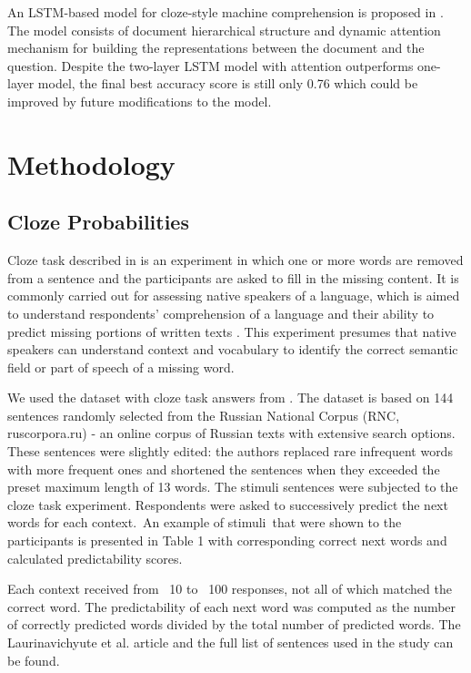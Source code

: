 \documentclass[a4paper]{article}
\begin{document}
An LSTM-based model for cloze-style machine comprehension is proposed in \cite{wang-cloze}. The model consists of document hierarchical structure and dynamic attention mechanism for building the representations between the document and the question. Despite the two-layer LSTM model with attention outperforms one-layer model, the final best accuracy score is still only 0.76 which could be improved by future modifications to the model.


\section{Methodology}

\subsection{Cloze Probabilities}

Cloze task described in \cite{taylor:1953} is an experiment in which one or more words are removed from a sentence and the participants are asked to fill in the missing content. It is commonly carried out for assessing native speakers of a language, which is aimed to understand respondents’ comprehension of a language and their ability to predict missing portions of written texts \cite{laurinavichyute}. This experiment presumes that native speakers can understand context and vocabulary to identify the correct semantic field or part of speech of a missing word.

We used the dataset with cloze task answers from \cite{laurinavichyute}. The dataset is based on 144 sentences randomly selected from the Russian National Corpus (RNC, ruscorpora.ru) - an online corpus of Russian texts with extensive search options. These sentences were slightly edited: the authors replaced rare infrequent words with more frequent ones and shortened the sentences when they exceeded the preset maximum length of 13 words. The stimuli sentences were subjected to the cloze task experiment. Respondents were asked to successively predict the next words for each context. An example of stimuli that were shown to the participants is presented in Table 1 with corresponding correct next words and calculated predictability scores.

Each context received from ~10 to ~100 responses, not all of which matched the correct word. The predictability of each next word was computed as the number of correctly predicted words divided by the total number of predicted words. The Laurinavichyute et al. article and the full list of sentences used in the study can be found. 
\end{document}
